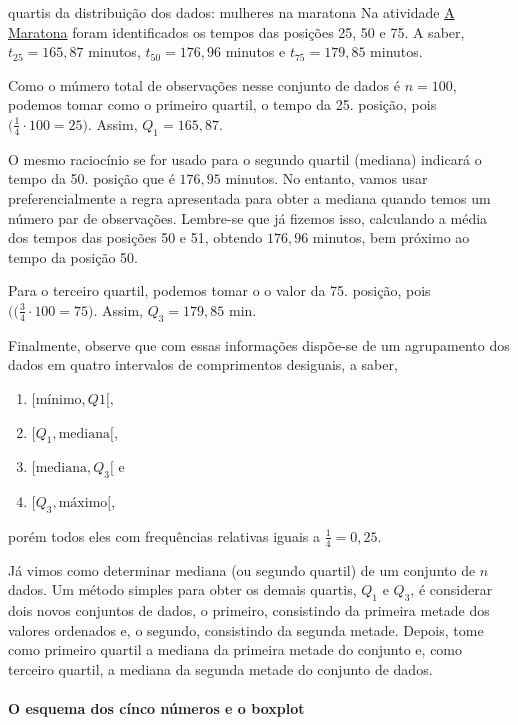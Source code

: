 \begin{example}{quartis da distribuição dos dados: mulheres na maratona}
Na atividade \hyperref[\detokenize{PE104-0:ativ-maratona-de-ny}]{A Maratona} foram identificados os tempos das posições 25, 50 e 75. A saber, $t_25=165{,}87$ minutos, $t_50=176{,}96$ minutos e $t_75=179{,}85$ minutos.

Como o múmero total de observações nesse conjunto de dados é $n=100$, podemos tomar como o primeiro quartil, o tempo da 25. posição, pois $\big(\frac{1}{4}\cdot100=25\big)$. Assim, $Q_1=165{,}87$.

O mesmo raciocínio se for usado para o segundo quartil (mediana) indicará o tempo da 50. posição que é $176{,}95$ minutos. No entanto, vamos usar preferencialmente a regra apresentada para obter a mediana quando temos um número par de observações. Lembre-se que já fizemos isso, calculando a média dos tempos das posições 50 e 51, obtendo $176{,}96$ minutos, bem próximo ao tempo da posição 50.

Para o terceiro quartil, podemos tomar o o valor da 75. posição, pois $(\big(\frac{3}{4}\cdot100=75\big)$. Assim, $Q_3=179{,}85$ min.

Finalmente, observe que com essas informações dispõe-se de um agrupamento dos dados em quatro intervalos de comprimentos desiguais, a saber,

\begin{enumerate}
\item $[\text{mínimo},Q1[$,
\item $[Q_1,\text{mediana}[$,
\item $[\text{mediana},Q_3[$ e
\item $[Q_3,\text{máximo}[$,
\end{enumerate}

porém todos eles com frequências relativas iguais a $\frac{1}{4}=0{,}25$.
\end{example}

Já vimos como determinar mediana (ou segundo quartil) de um conjunto de $n$ dados. Um método simples para obter os demais quartis, $Q_1$ e $Q_3$, é considerar dois novos conjuntos de dados, o primeiro, consistindo da primeira metade dos valores ordenados e, o segundo, consistindo da segunda metade. Depois, tome como primeiro quartil a mediana da primeira metade do conjunto e, como terceiro quartil, a mediana da segunda metade do conjunto de dados.

\paragraph{O esquema dos cínco números e o boxplot}


